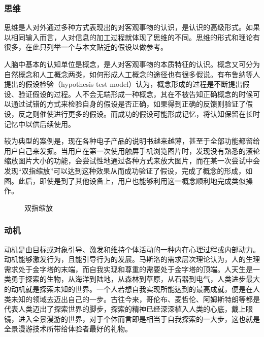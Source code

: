 \subsubsection{思维}
思维是人对外通过多种方式表现出的对客观事物的认识，是认识的高级形式。如果以相同输入而言，人对信息的加工过程就体现了思维的不同。思维的形式和理论有很多，在此只列举一个与本文贴近的假设以做参考。

人脑中基本的认知单位是概念，是人对客观事物的本质特征的认识。概念又可分为自然概念和人工概念两类，如何形成人工概念的途径也有很多假说。有布鲁纳等人提出的假设检验（hypothesis test model）认为，概念形成的过程是不断提出假设、验证假设的过程。人不会无端形成一种概念，其在不被告知正确概念的时候可以通过试错的方式来检验自身的假设是否正确，如果得到正确的反馈则验证了假设，反之则催使进行更多的假设。而成功的假设可能形成记忆，将认知保留在长时记忆中以供后续使用。

较为典型的案例是，现在各种电子产品的说明书越来越薄，甚至于全部功能都留给用户自己来发掘。当用户在第一次使用触屏手机浏览图片时，发现没有熟悉的滚轮缩放图片大小的功能，会尝试性地通过各种方式来放大图片，而在某一次尝试中会发现“双指缩放”可以达到这种效果从而成功验证了假设，完成了概念的形成，如图。此后，即使是到了其他设备上，用户也能够利用这一概念顺利地完成类似操作。

\begin{figure}[htp]
\centering
{}
\caption{双指缩放}
\label{fig:stretch}
\end{figure}

\subsubsection{动机}
动机是由目标或对象引导、激发和维持个体活动的一种内在心理过程或内部动力。动机能够激发行为，且能引导行为的发展。马斯洛的需求层次理论认为，人的生理需求处于金字塔的末端，而自我实现和尊重的需要处于金字塔的顶端。人天生是一类勇于探索的生物，从海洋到陆地，从森林到草原，从石器到电气，人类进步最大的动机就是探索未知的世界。一个人若想自我实现所能达到的最高成就，便是在人类未知的领域去迈出自己的一步。古往今来，哥伦布、麦哲伦、阿姆斯特朗等都是代表人类迈出了探索世界的脚步，探索的精神已经深深植入人类的心底，戴上眼镜，进入全景漫游的世界，对于个体而言即是相当于自我探索的一大步，这也就是全景漫游技术所带给体验者最好的礼物。